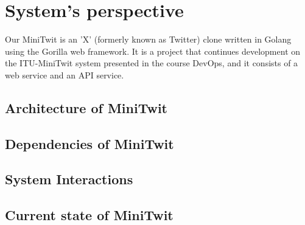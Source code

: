 \section{System's perspective}
Our MiniTwit is an 'X' (formerly known as Twitter) clone written in Golang using the Gorilla web framework. It is a project that continues development on the ITU-MiniTwit system presented in the course DevOps, and it consists of a web service and an API service. 

\subsection{Architecture of MiniTwit}


\subsection{Dependencies of MiniTwit}


\subsection{System Interactions}


\subsection{Current state of MiniTwit}

